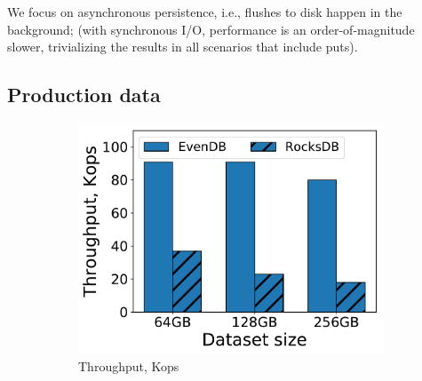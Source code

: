 \documentclass[sigplan,10pt]{acmart}
\newcommand{\inred}[1]{{\color{red}{#1}}}
\providecommand{\DIFaddbeginFL}{} %
\providecommand{\DIFaddendFL}{} %
\providecommand{\DIFdelbeginFL}{} %
\providecommand{\DIFdelendFL}{} %
\begin{document}
We focus on asynchronous persistence,  i.e., flushes to disk happen in the background; 
(with synchronous I/O, performance is an order-of-magnitude slower, trivializing the results 
in all scenarios that include puts). 


\subsection{Production data}
\label{ssec:prod}

\begin{figure}[tb]
\centering
\DIFdelbeginFL %
\DIFdelendFL \DIFaddbeginFL \begin{subfigure}{0.29\linewidth}
\DIFaddendFL \includegraphics[width=\textwidth]{figs/ingestion.pdf}
\caption{Throughput, Kops}
\label{fig:prod:ingestion:a}
\end{subfigure}
\hspace{0.03\linewidth} 
\DIFdelbeginFL %
\DIFdelendFL \DIFaddbeginFL \begin{subfigure}{0.29\linewidth}

\end{subfigure}
\end{figure}
\end{document}
